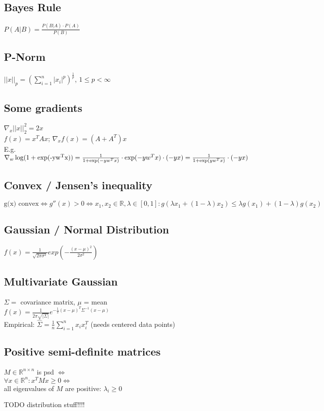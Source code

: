 \documentclass[11pt]{article}
\begin{document}
\begin{multicols*}{3}
\subsection*{{Bayes Rule}}
$P(A|B) = \frac{P(B|A) \cdot P(A)}{P(B)}$

\subsection*{P-Norm}
$||x||_p = (\sum_{i=1}^n|x_i|^p)^{\frac{1}{p}}$, $1 \leq p < \infty$

\subsection*{Some gradients}
$\nabla_x ||x||_2^2 = 2 x$\\
$f(x) = x^T A x$; $\nabla_x f(x) = (A + A^T) x$\\
E.g. $\nabla_w \operatorname{log}(1+\operatorname{exp(-y w^T x)}) = \\
\frac{1}{1+\operatorname{exp}(-y w^T x)} \cdot \operatorname{exp}(-y w^T x) \cdot (-y x) = \\
\frac{1}{1 + \operatorname{exp}(y w^T x)} \cdot(-yx)$\\


\subsection*{Convex / Jensen's inequality}
$\text{g(x) convex} \Leftrightarrow g''(x) > 0 \Leftrightarrow x_1,x_2 \in \mathbb{R}, \lambda \in [0,1]: 
g(\lambda x_1 + (1-\lambda) x_2) \leq \lambda g(x_1) + (1-\lambda) g(x_2)$

\subsection*{Gaussian / Normal Distribution}
$f(x) = \frac{1}{\sqrt{2\pi\sigma^2}} exp(-\frac{(x-\mu)^2}{2\sigma^2})$

\subsection*{Multivariate Gaussian}
$\Sigma =$ covariance matrix, $\mu$ = mean\\
$f(x) = \frac{1}{2\pi \sqrt{|\Sigma|}} e^{- \frac{1}{2} (x-\mu)^T \Sigma^{-1} (x-\mu)}$\\
Empirical: $\hat{\Sigma} = \frac{1}{n}\sum_{i=1}^n x_i x_i^T$ (needs centered data points)

\subsection*{Positive semi-definite matrices}
$M \in \mathbb{R}^{n\times n}$ is psd $\Leftrightarrow$\\
$\forall x \in \mathbb{R}^n: x^TMx \geq 0 \Leftrightarrow$\\
all eigenvalues of $M$ are positive: $\lambda_i\geq 0$

TODO distribution stuff!!!!	
\end{multicols*}




	
\end{document}
